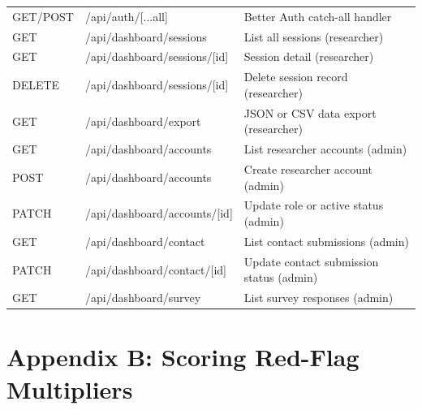 \documentclass[12pt,a4paper,oneside]{report}
\begin{document}
\begin{longtable}{llp{6cm}}
		GET/POST & /api/auth/[...all]                   & Better Auth catch-all handler \\
		GET      & /api/dashboard/sessions              & List all sessions (researcher) \\
		GET      & /api/dashboard/sessions/[id]         & Session detail (researcher) \\
		DELETE   & /api/dashboard/sessions/[id]         & Delete session record (researcher) \\
		GET      & /api/dashboard/export                & JSON or CSV data export (researcher) \\
		GET      & /api/dashboard/accounts              & List researcher accounts (admin) \\
		POST     & /api/dashboard/accounts              & Create researcher account (admin) \\
		PATCH    & /api/dashboard/accounts/[id]         & Update role or active status (admin) \\
		GET      & /api/dashboard/contact               & List contact submissions (admin) \\
		PATCH    & /api/dashboard/contact/[id]          & Update contact submission status (admin) \\
		GET      & /api/dashboard/survey                & List survey responses (admin) \\
		\bottomrule
	\end{longtable}
	
	\section*{Appendix B: Scoring Red-Flag Multipliers}
	
\end{document}
